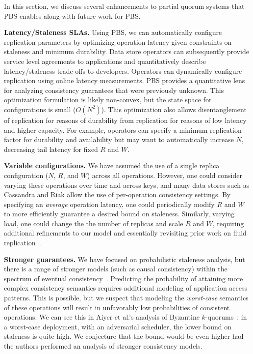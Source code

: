 \documentclass{vldb}
\begin{document}
In this section, we discuss several enhancements to partial
quorum systems that PBS enables along with future work for PBS.

\textbf{Latency/Staleness SLAs.} Using PBS, we can automatically
configure replication parameters by optimizing operation latency given
constraints on staleness and minimum durability.  Data store operators
can subsequently provide service level agreements to applications and
quantitatively describe latency/staleness trade-offs to developers.
Operators can dynamically configure replication using online latency
measurements.  PBS provides a quantitative lens for analyzing
consistency guarantees that were previously unknown.  This
optimization formulation is likely non-convex, but the state space for
configurations is small ($O(N^2)$).  This optimization also allows
disentanglement of replication for reasons of durability from
replication for reasons of low latency and higher capacity.  For
example, operators can specify a minimum replication factor for
durability and availability but may want to automatically increase
$N$, decreasing tail latency for fixed $R$ and $W$.

\textbf{Variable configurations.} We have assumed the use of a single
replica configuration ($N$, $R$, and $W$) across all operations.
However, one could consider varying these operations over time and
across keys, and many data stores such as Cassandra and Riak allow the
use of per-operation consistency settings.  By specifying an
\textit{average} operation latency, one could periodically modify $R$
and $W$ to more efficiently guarantee a desired bound on staleness.
Similarly, varying load, one could change the the
number of replicas and scale $R$ and $W$, requiring additional
refinements to our model and essentially revisiting prior work on fluid
replication~\cite{fluidreplication}.

\textbf{Stronger guarantees.} We have focused on probabilistic
staleness analysis, but there is a range of stronger models (such as
causal consistency) within the spectrum of eventual
consistency~\cite{vogels-defs}.  Predicting the probability of
attaining more complex consistency semantics requires additional
modeling of application access patterns.  This is possible, but we
suspect that modeling the \textit{worst-case} semantics of these
operations will result in unfavorably low probabilities of consistent
operations.  We can see this in Aiyer et al.'s analysis of Byzantine
$k$-quorums~\cite{multi-k-quorum}: in a worst-case deployment, with an
adversarial scheduler, the lower bound on staleness is quite high.  We
conjecture that the bound would be even higher had the authors
performed an analysis of stronger consistency models.
\end{document}
